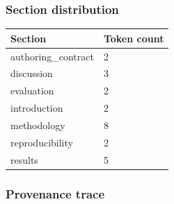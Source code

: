 \documentclass[
  english,
]{article}
\newcounter{none} %
\begin{document}
\subsubsection{Section distribution}\label{section-distribution}

{\def\LTcaptype{none} %
\begin{longtable}[]{@{}ll@{}}
\toprule\noalign{}
Section & Token count \\
\midrule\noalign{}
\endhead
\bottomrule\noalign{}
\endlastfoot
authoring\_contract & 2 \\
discussion & 3 \\
evaluation & 2 \\
introduction & 2 \\
methodology & 8 \\
reproducibility & 2 \\
results & 5 \\
\end{longtable}
}

\subsubsection{Provenance trace}\label{provenance-trace}
\end{document}

